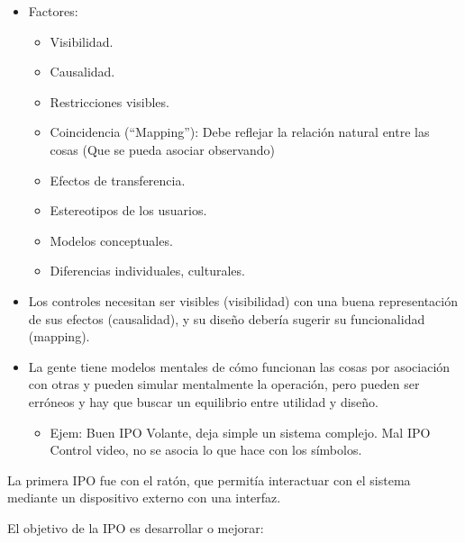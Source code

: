 \documentclass[12pt, twoside, openright]{report} %
\begin{document}
\begin{itemize}
	\item Factores:
	      \begin{itemize}
		      \item Visibilidad.

		      \item Causalidad.

		      \item Restricciones visibles.

		      \item Coincidencia (``Mapping''): Debe reflejar la relación natural
		            entre las cosas (Que se pueda asociar observando)

		      \item Efectos de transferencia.

		      \item Estereotipos de los usuarios.

		      \item Modelos conceptuales.

		      \item Diferencias individuales, culturales.
	      \end{itemize}
	\item Los controles necesitan ser visibles (visibilidad) con una buena
	      representación de sus efectos (causalidad), y su diseño debería
	      sugerir su funcionalidad (mapping).
	\item La gente tiene modelos mentales de cómo funcionan las cosas por
	      asociación con otras y pueden simular mentalmente la operación,
	      pero pueden ser erróneos y hay que buscar un equilibrio entre
	      utilidad y diseño.

	      \begin{itemize}
		      \item Ejem: Buen IPO Volante, deja simple un sistema complejo. Mal IPO
		            Control video, no se asocia lo que hace con los símbolos.
	      \end{itemize}
\end{itemize}

La primera IPO fue con el ratón, que permitía interactuar con el
sistema mediante un dispositivo externo con una interfaz.

El objetivo de la IPO es desarrollar o mejorar:
\end{document}
